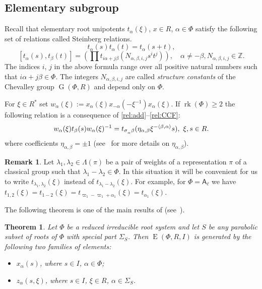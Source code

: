 \documentclass[12pt]{amsart}
\numberwithin{equation}{section}
\newcounter{thmcounter} \newcounter{lemmacounter}
\newtheorem{thm}[thmcounter]{Theorem}
\theoremstyle{definition}
\newtheorem{rem}[equation]{Remark}
\DeclareMathOperator{\G}{G}
\DeclareMathOperator{\E}{E}
\DeclareMathOperator{\rk}{rk}
\newcommand{\rA}{\mathsf{A}}
\def\ssub#1{\mathchoice
   {_{\lower2pt\hbox{$\scriptstyle #1$}}}
   {_{\lower2pt\hbox{$\scriptstyle #1$}}}
   {_{\lower1.5pt\hbox{$\scriptscriptstyle #1$}}}
   {_{\!\lower1.5pt\hbox{$\scriptscriptstyle #1$}}}}
\begin{document}
\subsection{Elementary subgroup}
Recall that elementary root unipotents $t_{\alpha}(\xi)$, $x\in R$, $\alpha\in\Phi$ satisfy the following set of relations called Steinberg relations.
\begin{equation}\label{rel:add} t_\alpha(s) t_\alpha(t) = t_\alpha(s+t), \end{equation} 
\begin{equation}\label{rel:CCF} [t_\alpha(s),  t_\beta(t)] = \left(\prod\limits t_{i\alpha + j\beta}(N_{\alpha,\beta, i, j}s^i t^j)\right),\quad \alpha\neq-\beta, N_{\alpha, \beta, i, j}\in\mathbb{Z}.\end{equation}
The indices $i$, $j$ in the above formula range over all positive natural numbers such that $i\alpha + j\beta\in\Phi$.
The integers $N_{\alpha, \beta, i, j}$ are called {\it structure constants} of the Chevalley group $\G(\Phi,R)$ and depend only on $\Phi$.

For $\xi\in R^*$ set $w_\alpha(\xi) := x_\alpha(\xi) x_{-\alpha}(-\xi^{-1}) x_{\alpha}(\xi).$
If $\rk(\Phi)\geq 2$ the following relation is a consequence of \ref{rel:add}--\ref{rel:CCF}:
\begin{equation}\label{rel:R3} w_\alpha(\xi) t_{\beta}(s) w_\alpha(\xi)^{-1} =
t_{\sigma\ssub{\alpha}\beta} (\eta_{\alpha, \beta}\xi^{-\langle\beta,\alpha \rangle} s),\ \xi,s\in R. \end{equation}
where coefficients $\eta_{\alpha, \beta} = \pm 1$ (see~\cite[\S13]{VP} for more details on $\eta_{\alpha, \beta}$).

\begin{rem} Let $\lambda_1, \lambda_2 \in \Lambda(\pi)$ be a pair of weights of a representation $\pi$ of a classical group such that $\lambda_1-\lambda_2\in \Phi$.
In this situation it will be convenient for us to write $t_{\lambda_1,\lambda_2}(\xi)$ instead of $t_{\lambda_1-\lambda_2}(\xi)$.
For example, for $\Phi=\rA_\ell$ we have $t_{1,2}(\xi)=t_{1-2}(\xi)=t_{\varpi_1 - \varpi_1 + \alpha_1}(\xi) = t_{\alpha_1}(\xi)$. \end{rem}

The following theorem is one of the main results of \cite{S} (see~\cite[Theorem~3.4]{S}).
\begin{thm}\label{theorem:Stepanov}
Let $\Phi$ be a reduced irreducible root system and let $S$ be any parabolic subset of roots of $\Phi$ with special part $\Sigma_S$.
Then $\E(\Phi, R, I)$ is generated by the following two families of elements:
\begin{itemize}
 \item $x_{\alpha}(s)$, where $s\in I$, $\alpha\in\Phi$;
 \item $z_\alpha(s,\xi)$, where $s\in I$, $\xi\in R$, $\alpha\in\Sigma_S$. \end{itemize} \end{thm}
\end{document}
